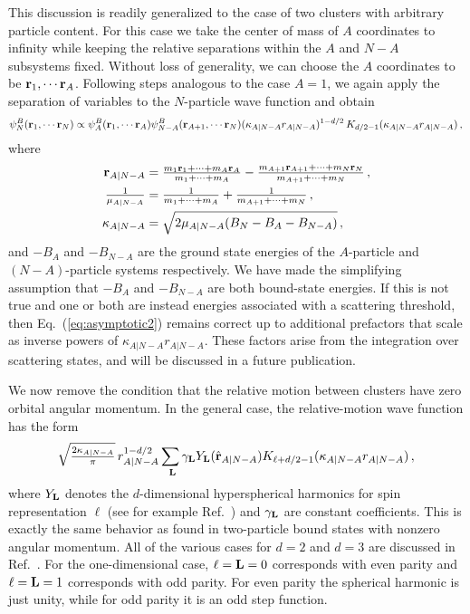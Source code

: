 \documentclass[aps,singlecolumn,superscriptaddress,nofootinbib,tightenlines,
preprintnumbers,showkeys]{revtex4-1}
\begin{document}
This discussion is readily generalized to the case of two clusters with 
arbitrary particle content.  For this case we take the center of mass of $A$ 
coordinates to infinity while keeping the relative separations within the $A$ 
and $N{-}A$ subsystems fixed.  Without loss of generality, we can choose the 
$A$ coordinates to be ${\bf r}_1,\cdots{\bf r}_{A}$.  Following steps analogous 
to the case $A=1$, we again apply the separation of variables to the
$N$-particle wave function and obtain
%
\begin{equation}
 \psi^B_N ({\bf r}_1,\cdots{\bf r}_N)
 \propto \psi^B_{A}({\bf r}_1,\cdots{\bf r}_{A})
 \psi^B_{N-A}({\bf r}_{A+1},\cdots{\bf r}_{N})
 \null (\kappa_{ A|N-A} r_{A|N-A})^{1-d/2} \,
 K_{d/2-1}(\kappa_{A|N-A}r_{A|N-A}) \,,
\label{eq:asymptotic2}
\end{equation}
%
where
%
\begin{align}
 {\bf r}_{A|N-A}
 &= \tfrac{m_1{\bf r}_1+\cdots+ m_{A}{\bf r}_{A}}{m_1+\cdots+m_A}
 -\tfrac{m_{A+1}{\bf r}_{A+1}
 + \cdots + m_{N}{\bf r}_{N}}{m_{A+1}+\cdots+m_N} \,, \\
 \tfrac{1}{\mu_{A|N-A}}
 &= \tfrac{1}{m_1+\cdots+ m_A}+\tfrac{1}{m_{A+1}+\cdots+m_N} \,, \\
 \kappa_{A|N-A}
 &= \sqrt{2\mu_{A|N-A}(B_{N}-B_{A}-B_{N-A})} \,,
\end{align}
%
and ${-}B_{A}$ and ${-}B_{N-A}$ are the ground state energies of the 
$A$-particle and $(N{-}A)$-particle systems respectively.  We have made the 
simplifying assumption that $-B_{A}$ and $-B_{N-A}$ are both bound-state 
energies.  If this is not true and one or both are instead energies associated 
with a scattering threshold, then Eq.~(\ref{eq:asymptotic2}) remains correct up 
to additional prefactors that scale as inverse powers of 
$\kappa_{A|N-A}r_{A|N-A}$.  These factors arise from the integration over 
scattering states, and will be discussed in a future publication.

We now remove the condition that the relative motion between clusters have zero 
orbital angular momentum.  In the general case, the relative-motion wave
function has the form
%
\begin{equation}
 \sqrt{\tfrac{2\kappa_{ A|N-A}}{\pi}}\,r_{A|N-A}^{1-d/2}\sum_{{\bf\ L}}
 \gamma_{\bf{L}} 
 Y_{\bf{L}}(\hat{{\bf r}}_{A|N-A})
 \null K_{\ell+d/2-1}(\kappa_{A|N-A}r_{A|N-A}) \,,
\label{eq:ANC1}
\end{equation}
%
where $Y_{\bf{L}}$ denotes the $d$-dimensional hyperspherical harmonics for
spin representation $\ell$ (see for example Ref.~\cite{Hammer:2010fw}) and 
$\gamma_{\bf{L}}$ are constant coefficients.  This is exactly the same behavior
as found in two-particle bound states with nonzero angular momentum.  All of 
the various cases for $d=2$ and $d=3$ are discussed in Ref.~\cite{Konig:2011ti}.
For the one-dimensional case, $\ell={\bf L}=0$ corresponds with even parity and 
$\ell ={\bf L}=1$ corresponds with odd parity.  For even parity the spherical 
harmonic is just unity, while for odd parity it is an odd step function.
\end{document}

